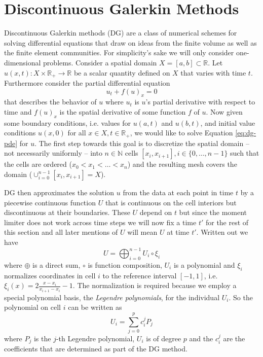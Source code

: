\section{Discontinuous Galerkin Methods}
\label{sec:dg}

Discontinuous Galerkin methods (DG) are a class of numerical schemes for solving differential equations that draw on ideas from the finite volume as well as the finite element communities.
For simplicity's sake we will only consider one-dimensional problems.
Consider a spatial domain $X = [a, b] \subset \mathbb{R}$.
Let $u(x, t) : X \times \mathbb{R}_{+} \rightarrow \mathbb{R}$ be a scalar quantity defined on $X$ that varies with time $t$.
Furthermore consider the partial differential equation
\begin{equation}
  \label{eq:dg-pde}
  u_{t} + f(u)_{x} = 0
\end{equation}
that describes the behavior of $u$ where $u_{t}$ is $u$'s partial derivative with respect to time and $f(u)_{x}$ is the spatial derivative of some function $f$ of $u$.
Now given some boundary conditions, i.e. values for $u(a, t)$ and $u(b, t)$, and initial value conditions $u(x, 0)$ for all $x \in X, t \in \mathbb{R}_{+}$, we would like to solve Equation \eqref{eq:dg-pde} for $u$.
The first step towards this goal is to discretize the spatial domain -- not necessarily uniformly -- into $n \in \mathbb{N}$ cells $[x_{i}, x_{i + 1}], i \in \{ 0, \dots, n - 1 \}$ such that the cells are ordered ($x_{0} < x_{1} < \dots < x_{n}$) and the resulting mesh covers the domain ($\cup_{i = 0}^{n - 1} [x_{i}, x_{i + 1}] = X$).

DG then approximates the solution $u$ from the data at each point in time $t$ by a piecewise continuous function $U$ that is continuous on the cell interiors but discontinuous at their boundaries.
These $U$ depend on $t$ but since the moment limiter does not work across time steps we will now fix a time $t'$ for the rest of this section and all later mentions of $U$ will mean $U$ at time $t'$.
Written out we have
\begin{equation*}
  U = \bigoplus_{i = 0}^{n - 1} U_{i} \circ \xi_{i}
\end{equation*}
where $\oplus$ is a direct sum, $\circ$ is function composition, $U_{i}$ is a polynomial and $\xi_{i}$ normalizes coordinates in cell $i$ to the reference interval $[-1, 1]$, i.e. $\xi_{i}(x) = 2 \frac{x - x_{i}}{x_{i + 1} - x_{i}} - 1$.
The normalization is required because we employ a special polynomial basis, the \emph{Legendre polynomials}, for the individual $U_{i}$.
So the polynomial on cell $i$ can be written as
\begin{equation*}
  U_{i} = \sum_{j = 0}^{p} c_{i}^{j} P_{j}
\end{equation*}
where $P_{j}$ is the $j$-th Legendre polynomial, $U_{i}$ is of degree $p$ and the $c_{i}^{j}$ are the coefficients that are determined as part of the DG method.

